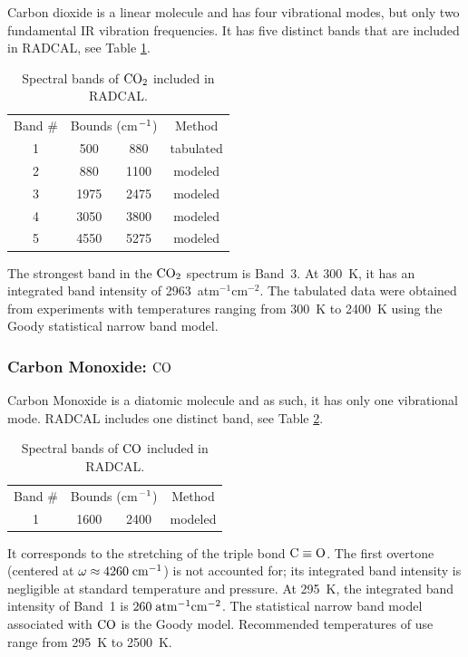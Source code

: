 Carbon dioxide is a linear molecule and has four vibrational modes, but only two fundamental IR vibration frequencies. It has five distinct bands that are included in RADCAL, see Table \ref{Table::CO2}.
\begin{table}[h!]
    \centering
    \caption{Spectral bands of $\rm CO_2$ included in RADCAL.}
    \vspace{0.1in}
    \label{Table::CO2}
    \begin{tabular}{|c|c|c|c|}
      \hline
      Band \# & \multicolumn{2}{|l|}{Bounds (cm$\rm ^{-1}$) } & Method \\
      \cline{1-4}
      1 &  500 & 880  & tabulated \\
      2 &  880 & 1100 & modeled \\
      3 & 1975 & 2475 & modeled \\
      4 & 3050 & 3800 & modeled \\
      5 & 4550 & 5275 & modeled \\
      \hline
    \end{tabular}
\end{table}
The strongest band in the $\rm CO_2$ spectrum is Band~3. At 300~K, it has an integrated band intensity of 2963~atm$^{-1}$cm$^{-2}$. The tabulated data were obtained from experiments with temperatures ranging from 300~K to 2400~K using the Goody statistical narrow band model.

\subsubsection{Carbon Monoxide: $\rm CO$}

Carbon Monoxide is a diatomic molecule and as such, it has only one vibrational mode. RADCAL includes one distinct band, see Table \ref{Table::CO}.
\begin{table}[h!]
    \centering
    \caption{Spectral bands of $\rm CO$ included in RADCAL.}
    \vspace{0.1in}
    \label{Table::CO}
    \begin{tabular}{|c|c|c|c|}
      \hline
      Band \# & \multicolumn{2}{|l|}{Bounds (cm$\rm ^{-1}$) } & Method \\
      \cline{1-4}
      1 & 1600 & 2400 & modeled \\
      \hline
    \end{tabular}
\end{table}
It corresponds to the stretching of the triple bond $\rm C \equiv O$. The first overtone (centered at $ \omega\approx 4260\;\rm {cm^{-1}}$) is not accounted for; its integrated band intensity is negligible at standard temperature and pressure. At 295~K, the integrated band intensity of Band~1 is $260\;\rm {atm^{-1}cm^{-2}}$.
The statistical narrow band model associated with $\rm CO$ is the Goody model. Recommended temperatures of use range from 295~K to 2500~K.

